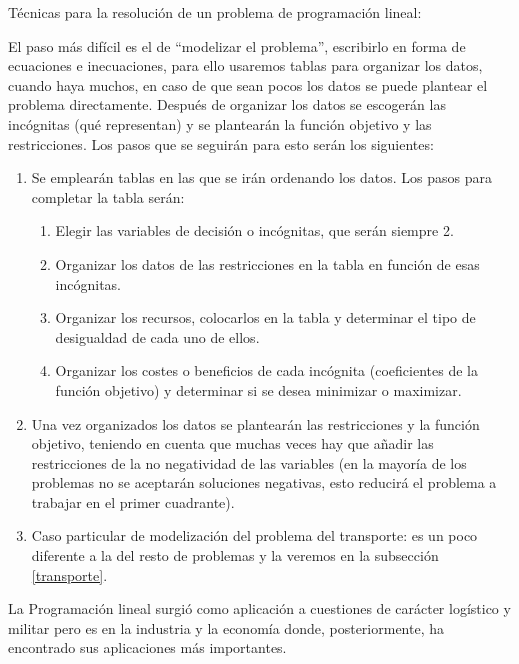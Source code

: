 \begin{myalertblock}{Técnicas para la resolución de un problema de programación lineal:}


El paso más difícil es el de ``modelizar el problema'', escribirlo en forma de ecuaciones e inecuaciones, para ello usaremos tablas para organizar los datos, cuando haya muchos, en caso de que sean pocos los datos se puede plantear el problema directamente. Después de organizar los datos se escogerán las incógnitas (qué representan) y se plantearán la función objetivo y las restricciones. Los pasos que se seguirán para esto serán los siguientes:

\begin{enumerate}
\item Se emplearán tablas en las que se irán ordenando los datos. Los pasos para completar la tabla serán:
	\begin{enumerate}
	\item Elegir las variables de decisión o incógnitas, que serán siempre 2.
	\item Organizar los datos de las restricciones en la tabla en función de esas
	incógnitas.
	\item Organizar los recursos, colocarlos en la tabla y determinar el tipo de desigualdad de cada uno de ellos.
	\item Organizar los costes o beneficios de cada incógnita (coeficientes de la
	función objetivo) y determinar si se desea minimizar o maximizar.
	\end{enumerate}
\item Una vez organizados los datos se plantearán las restricciones y la función objetivo, teniendo en cuenta que muchas veces hay que añadir las restricciones de la no negatividad de las variables \textcolor{gris}{(en la mayoría de los problemas no se aceptarán soluciones negativas, esto reducirá el problema a trabajar en el primer cuadrante)}.
\item Caso particular de modelización del problema del transporte:  es un poco diferente a la del resto de problemas y la veremos en la subsección \ref{transporte}.
\end{enumerate}
\end{myalertblock}

\vspace{5mm}
La Programación lineal surgió como aplicación a cuestiones de carácter logístico y militar pero es en la industria y la economía donde, posteriormente, ha encontrado sus aplicaciones más importantes.

